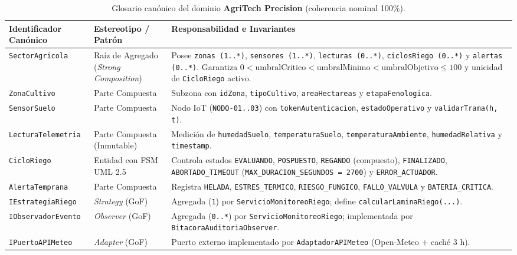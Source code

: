 \documentclass[11pt,letterpaper]{report}
\begin{document}
\begin{table}[H]
\centering
\caption{Glosario canónico del dominio \textbf{AgriTech Precision} (coherencia nominal 100\%).}
\small
\begin{tabularx}{\textwidth}{l L{3.6cm} Y}
\toprule
\textbf{Identificador Canónico} & \textbf{Estereotipo / Patrón} & \textbf{Responsabilidad e Invariantes} \\
\midrule
\texttt{SectorAgricola} & Raíz de Agregado (\textit{Strong Composition}) & Posee \texttt{zonas (1..*)}, \texttt{sensores (1..*)}, \texttt{lecturas (0..*)}, \texttt{ciclosRiego (0..*)} y \texttt{alertas (0..*)}. Garantiza $0 < \text{umbralCritico} < \text{umbralMinimo} < \text{umbralObjetivo} \le 100$ y unicidad de \texttt{CicloRiego} activo. \\
\texttt{ZonaCultivo} & Parte Compuesta & Subzona con \texttt{idZona}, \texttt{tipoCultivo}, \texttt{areaHectareas} y \texttt{etapaFenologica}. \\
\texttt{SensorSuelo} & Parte Compuesta & Nodo IoT (\texttt{NODO-01..03}) con \texttt{tokenAutenticacion}, \texttt{estadoOperativo} y \texttt{validarTrama(h, t)}. \\
\texttt{LecturaTelemetria} & Parte Compuesta (Inmutable) & Medición de \texttt{humedadSuelo}, \texttt{temperaturaSuelo}, \texttt{temperaturaAmbiente}, \texttt{humedadRelativa} y \texttt{timestamp}. \\
\texttt{CicloRiego} & Entidad con FSM UML 2.5 & Controla estados \texttt{EVALUANDO}, \texttt{POSPUESTO}, \texttt{REGANDO} (compuesto), \texttt{FINALIZADO}, \texttt{ABORTADO\_\allowbreak TIMEOUT} (\texttt{MAX\_\allowbreak DURACION\_\allowbreak SEGUNDOS = 2700}) y \texttt{ERROR\_\allowbreak ACTUADOR}. \\
\texttt{AlertaTemprana} & Parte Compuesta & Registra \texttt{HELADA}, \texttt{ESTRES\_\allowbreak TERMICO}, \texttt{RIESGO\_\allowbreak FUNGICO}, \texttt{FALLO\_\allowbreak VALVULA} y \texttt{BATERIA\_\allowbreak CRITICA}. \\
\texttt{IEstrategiaRiego} & \textit{Strategy} (GoF) & Agregada (\texttt{1}) por \texttt{ServicioMonitoreoRiego}; define \texttt{calcularLaminaRiego(...)}. \\
\texttt{IObservadorEvento} & \textit{Observer} (GoF) & Agregada (\texttt{0..*}) por \texttt{ServicioMonitoreoRiego}; implementada por \texttt{BitacoraAuditoriaObserver}. \\
\texttt{IPuertoAPIMeteo} & \textit{Adapter} (GoF) & Puerto externo implementado por \texttt{AdaptadorAPIMeteo} (Open-Meteo + caché 3 h). \\

\end{tabularx}
\end{table}
\end{document}
